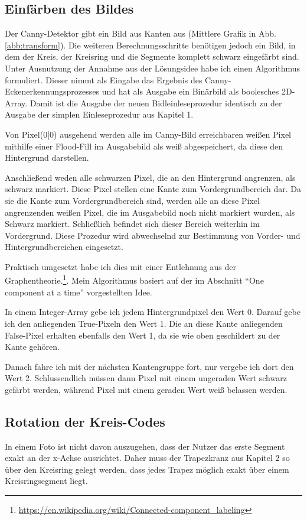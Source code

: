 \subsection{Einfärben des Bildes}
Der Canny-Detektor gibt ein Bild aus Kanten aus (Mittlere Grafik in Abb. \ref{abb:transform}). Die weiteren Berechnungsschritte benötigen jedoch ein Bild, in dem der Kreis, der Kreisring und die Segmente komplett schwarz eingefärbt sind. Unter Ausnutzung der Annahme aus der Lösungsidee habe ich einen Algorithmus formuliert.
Dieser nimmt als Eingabe das Ergebnis des Canny-Eckenerkennungsprozesses und hat als Ausgabe ein Binärbild als boolesches 2D-Array. Damit ist die Ausgabe der neuen Bidleinleseprozedur identisch zu der Ausgabe der simplen Einleseprozedur aus Kapitel 1.

Von Pixel(0|0) ausgehend werden alle im Canny-Bild erreichbaren weißen Pixel mithilfe einer Flood-Fill im Ausgabebild als weiß abgespeichert, da diese den Hintergrund darstellen.

Anschließend weden alle schwarzen Pixel, die an den Hintergrund angrenzen, als schwarz markiert. Diese Pixel stellen eine Kante zum Vordergrundbereich dar.
Da sie die Kante zum Vordergrundbereich sind, werden alle an diese Pixel angrenzenden weißen Pixel, die im Ausgabebild noch nicht markiert wurden, als Schwarz markiert. Schließlich befindet sich dieser Bereich weiterhin im Vordergrund.
Diese Prozedur wird abwechselnd zur Bestimmung von Vorder- und Hintergrundbereichen eingesetzt.

Praktisch umgesetzt habe ich dies mit einer Entlehnung aus der Graphentheorie.\footnote{\url{https://en.wikipedia.org/wiki/Connected-component_labeling}}. Mein Algorithmus basiert auf der im Abschnitt "`One component at a time"' vorgestellten Idee.

In einem Integer-Array gebe ich jedem Hintergrundpixel den Wert 0. Darauf gebe ich den anliegenden True-Pixeln den Wert 1. Die an diese Kante anliegenden False-Pixel erhalten ebenfalls den Wert 1, da sie wie oben geschildert zu der Kante gehören.

Danach fahre ich mit der nächsten Kantengruppe fort, nur vergebe ich dort den Wert 2. Schlussendlich müssen dann Pixel mit einem ungeraden Wert schwarz gefärbt werden, während Pixel mit einem geraden Wert weiß belassen werden.

\subsection {Rotation der Kreis-Codes}
In einem Foto ist nicht davon auszugehen, dass der Nutzer das erste Segment exakt an der x-Achse ausrichtet. Daher muss der Trapezkranz aus Kapitel 2 so über den Kreisring gelegt werden, dass jedes Trapez möglich exakt über einem Kreisringsegment liegt. 

